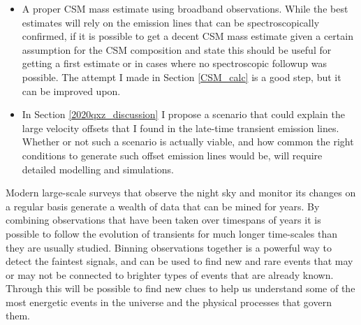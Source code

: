 \documentclass[a4paper,oneside,12pt, class=Latex/Classes/PhDthesisPSnPDF, crop=false]{standalone}
\begin{document}
\begin{itemize}
	\item A proper CSM mass estimate using broadband observations. While the best estimates will rely on the emission lines that can be spectroscopically confirmed, if it is possible to get a decent CSM mass estimate given a certain assumption for the CSM composition and state this should be useful for getting a first estimate or in cases where no spectroscopic followup was possible. The attempt I made in Section \ref{CSM_calc} is a good step, but it can be improved upon.
	\item In Section \ref{2020qxz_discussion} I propose a scenario that could explain the large velocity offsets that I found in the late-time transient emission lines. Whether or not such a scenario is actually viable, and how common the right conditions to generate such offset emission lines would be, will require detailed modelling and simulations.
\end{itemize}

Modern large-scale surveys that observe the night sky and monitor its changes on a regular basis generate a wealth of data that can be mined for years. By combining observations that have been taken over timespans of years it is possible to follow the evolution of transients for much longer time-scales than they are usually studied. Binning observations together is a powerful way to detect the faintest signals, and can be used to find new and rare events that may or may not be connected to brighter types of events that are already known. Through this will be possible to find new clues to help us understand some of the most energetic events in the universe and the physical processes that govern them.
\end{document}
